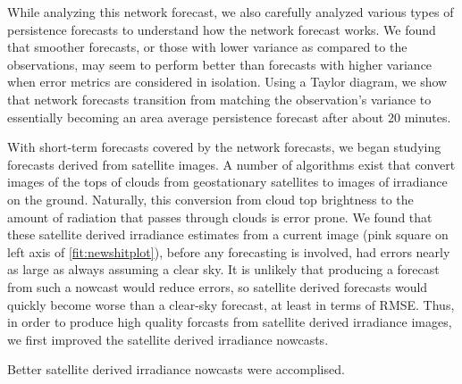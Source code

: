 While analyzing this network forecast, we also carefully analyzed
various types of persistence forecasts to understand how the network
forecast works.
We found that smoother forecasts, or those with lower variance as
compared to the observations, may seem to perform better than
forecasts with higher variance when error metrics are considered in
isolation.
Using a Taylor diagram, we show that network forecasts transition from
matching the observation's variance to essentially becoming an area
average persistence forecast after about 20 minutes.

With short-term forecasts covered by the network forecasts, we began
studying forecasts derived from satellite images.
A number of algorithms exist that convert images of the tops of clouds
from geostationary satellites to images of irradiance on the ground.
Naturally, this conversion from cloud top brightness to the amount of
radiation that passes through clouds is error prone.
We found that these satellite derived irradiance estimates from a
current image (pink square on left axis of \cref{fit:newshitplot}),
before any forecasting is involved, had errors nearly as large as
always assuming a clear sky.
It is unlikely that producing a forecast from such a nowcast would
reduce errors, so satellite derived forecasts would quickly become
worse than a clear-sky forecast, at least in terms of RMSE.
Thus, in order to produce high quality forcasts from satellite derived
irradiance images, we first improved the satellite derived irradiance
nowcasts.

Better satellite derived irradiance nowcasts were accomplised.







